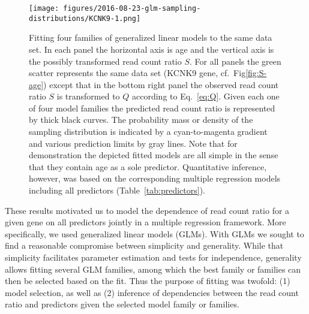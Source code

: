 \documentclass[12pt,letterpaper]{article}
\begin{document}
\begin{figure}
\begin{center}
\texttt{[image: figures/2016-08-23-glm-sampling-distributions/KCNK9-1.png]}
\end{center}
\caption{Fitting four families of generalized linear models to the same data
set.  In each panel the horizontal axis is age and the vertical axis is the
possibly transformed read count ratio \(S\).  For all panels the green scatter
represents the same data set (KCNK9 gene, cf.~Fig\ref{fig:S-age})
except that in the bottom right panel the observed read count ratio \(S\) is
transformed to \(Q\) according to Eq.~\ref{eq:Q}.  Given each one of four model
families the predicted read count ratio is represented by thick black curves.
The probability mass or density of the sampling distribution is indicated by a
cyan-to-magenta gradient and various prediction limits by gray lines.  Note
that for demonstration the depicted fitted models are all simple in the sense
that they contain age as a sole predictor.  Quantitative inference, however,
was based on the corresponding multiple regression models including all
predictors (Table~\ref{tab:predictors}).
  }
\label{fig:predicted-curves}
\end{figure}

These results motivated us to model the dependence of read count ratio for a
given gene on all predictors jointly in a multiple regression framework.  More
specifically, we used generalized linear models (GLMs).  With GLMs we sought
to find a reasonable compromise between simplicity and generality.  While that
simplicity facilitates parameter estimation and tests for independence,
generality allows fitting several GLM families, among which the best family or
families can then be selected based on the fit.  Thus the purpose of fitting
was twofold: (1) model selection, as well as (2) inference of dependencies
between the read count ratio and predictors given the selected model family or
families.
\end{document}
